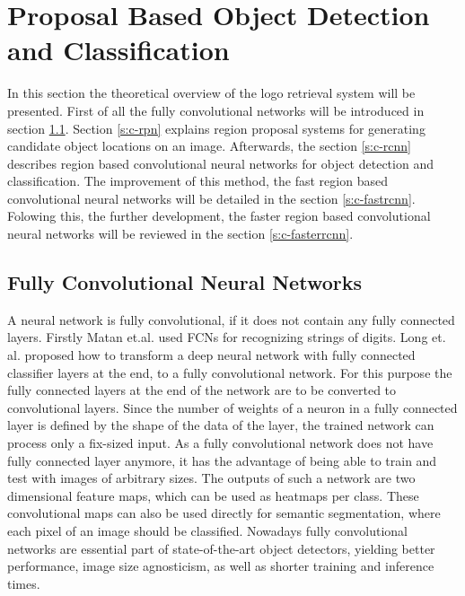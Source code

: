 \chapter{Proposal Based Object Detection and Classification}

In this section the theoretical overview of the logo retrieval system will be presented. First of all the fully convolutional networks will be introduced in section \ref{s:c-fullyconvnet}. Section \ref{s:c-rpn} explains region proposal systems for generating candidate object locations on an image. Afterwards, the section \ref{s:c-rcnn} describes region based convolutional neural networks for object detection and classification. The improvement of this method, the fast region based convolutional neural networks will be detailed in the section \ref{s:c-fastrcnn}. Folowing this, the further development, the faster region based convolutional neural networks will be reviewed in the section \ref{s:c-fasterrcnn}.

\section{Fully Convolutional Neural Networks}\label{s:c-fullyconvnet}
A neural network is fully convolutional, if it does not contain any fully connected layers. Firstly Matan et.al. used FCNs for recognizing strings of digits. Long et. al. proposed \cite{DBLP:journals/corr/LongSD14} how to transform a deep neural network with fully connected classifier layers at the end, to a fully convolutional network. For this purpose the fully connected layers at the end of the network are to be converted to convolutional layers.
\smallbreak
Since the number of weights of a neuron in a fully connected layer is defined by the shape of the data of the layer, the trained network can process only a fix-sized input. As a fully convolutional network does not have fully connected layer anymore, it has the advantage of being able to train and test with images of arbitrary sizes.
\smallbreak
The outputs of such a network are two dimensional feature maps, which can be used as heatmaps per class. These convolutional maps can also be used directly for semantic segmentation, where each pixel of an image should be classified.
Nowadays fully convolutional networks are essential part of state-of-the-art object detectors, yielding better performance, image size agnosticism, as well as shorter training and inference times.

